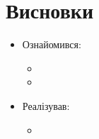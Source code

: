 \chapter{Висновки}
\begin{itemize}
	\item Ознайомився:
		\begin{itemize}
			\item
			\item
		\end{itemize}
	\item Реалізував:
		\begin{itemize}
			\item
		\end{itemize}
\end{itemize}
